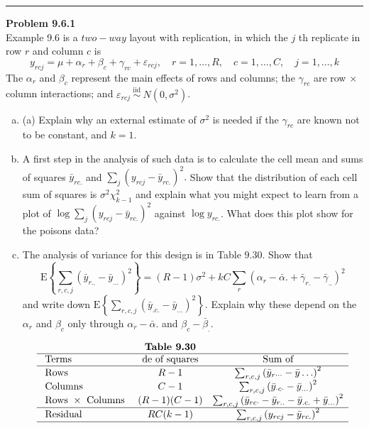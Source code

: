\documentclass[a4paper, 11pt]{article}
\newenvironment{problem}[2][Problem]
    { \begin{mdframed}[backgroundcolor=gray!20] \textbf{#1 #2} \\}
    {  \end{mdframed}}
\begin{document}
\noindent\rule{7in}{2.8pt}

\begin{problem}{9.6.1}
  Example 9.6 is a $t w o-w a y$ layout with replication, in which the $j$ th replicate in row $r$ and column $c$ is
  \[
  y_{r c j}=\mu+\alpha_{r}+\beta_{c}+\gamma_{r c}+\varepsilon_{r c j}, \quad r=1, \ldots, R, \quad c=1, \ldots, C, \quad j=1, \ldots, k
  \]
  The $\alpha_{r}$ and $\beta_{c}$ represent the main effects of rows and columns; the $\gamma_{r c}$ are row $\times$ column interactions; and $\varepsilon_{r c j} \stackrel{\text { iid }}{\sim} N\left(0, \sigma^{2}\right)$.
  \begin{enumerate}[(a)]
    \item (a) Explain why an external estimate of $\sigma^{2}$ is needed if the $\gamma_{r c}$ are known not to be constant, and $k=1$.

    \item A first step in the analysis of such data is to calculate the cell mean and sums of squares $\bar{y}_{r c .}$ and $\sum_{j}\left(y_{r c j}-\bar{y}_{r c .}\right)^{2} .$ Show that the distribution of each cell sum of squares is $\sigma^{2} \chi_{k-1}^{2}$ and explain what you might expect to learn from a plot of $\log \sum_{j}\left(y_{r c j}-\bar{y}_{r c .}\right)^{2}$ against $\log y_{rc.}$.
    What does this plot show for the poisons data?

    \item The analysis of variance for this design is in Table $9.30 .$ Show that
    $$
    \mathrm{E}\left\{\sum_{r, c, j}\left(\bar{y}_{r . .}-\bar{y}_{. . .}\right)^{2}\right\}=(R-1) \sigma^{2}+k C \sum_{r}\left(\alpha_{r}-\bar{\alpha} .+\bar{\gamma}_{r .}-\bar{\gamma}_{..}\right)^{2}
    $$
    and write down $\mathrm{E}\left\{\sum_{r, c, j}\left(\bar{y}_{. c .}-\bar{y}_{. . .}\right)^{2}\right\} .$ Explain why these depend on the $\alpha_{r}$ and $\beta_{c}$ only through $\alpha_{r}-\bar{\alpha}$. and $\beta_{c}-\bar{\beta}_.$.

    $$\begin{array}{lcc}
    \multicolumn{1}{c}
    {}&\textbf{Table 9.30} &{} \\
    \hline {\text { Terms }} &\text { de of squares } & \text { Sum of } \\
    \hline \text { Rows } & R-1 & \sum_{r, c, j}\left(\bar{y}_{r \cdots}-\bar{y} \ldots\right)^{2} \\
    \text { Columns } & C-1 & \sum_{r, c, j}\left(\bar{y}_{\cdot c \cdot}-\bar{y}_{\ldots}\right)^{2} \\
    \text { Rows } \times \text { Columns } & (R-1)(C-1) & \sum_{r, c, j}\left(\bar{y}_{r c \cdot}-\bar{y}_{r . .}-\bar{y}_{. c .}+\bar{y}_{\ldots}\right)^{2} \\
    \hline \text { Residual } & R C(k-1) & \sum_{r, c, j}\left(y_{r c j}-\bar{y}_{r c .}\right)^{2} \\
    \hline
    \end{array}$$


\end{enumerate}
\end{problem}
\end{document}
